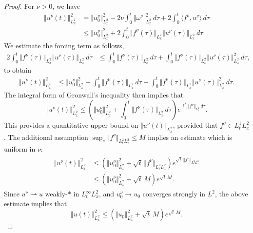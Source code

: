 \documentclass[reqno,12pt]{amsart}
\begin{document}
\begin{proof}
For $\nu > 0$, we have
\begin{align*}
\Vert u^\nu(t) \Vert_{L^2_x}^2
&=
\Vert u_0^\nu \Vert_{L^2_x}^2
- 2\nu \int_0^t \Vert \omega^\nu \Vert^2_{L^2_x} \, d\tau
+ 2\int_0^t \langle f^\nu, u^\nu \rangle \, d\tau
\\
&\le
\Vert u_0^\nu \Vert_{L^2_x}^2
+ 2\int_0^t \Vert f^\nu (\tau)\Vert_{L^2_x} \Vert u^\nu (\tau)\Vert_{L^2_x}  \, d\tau
\end{align*}
We estimate the forcing term as follows,
\begin{align*}
2\int_0^t \Vert f^\nu (\tau)\Vert_{L^2_x} \Vert u^\nu (\tau)\Vert_{L^2_x}  \, d\tau
&\le
\int_0^t \Vert f^\nu (\tau) \Vert_{L^2_x} \, d\tau
+
\int_0^t \Vert f^\nu (\tau) \Vert_{L^2_x}  \Vert u^\nu(\tau) \Vert_{L^2_x}^2 \, d\tau,
\end{align*}
to obtain
\begin{align*}
\Vert u^\nu(t) \Vert_{L^2_x}^2
&\le
\Vert u_0^\nu \Vert_{L^2_x}^2 + \int_0^t \Vert f^\nu (\tau) \Vert_{L^2_x} \, d\tau
+ \int_0^t \Vert f^\nu (\tau) \Vert_{L^2_x}  \Vert u^\nu(\tau) \Vert_{L^2_x}^2 \, d\tau.
\end{align*}
The integral form of Gronwall's inequality then implies that
\begin{equation} \label{Gronwall}
\Vert u^\nu(t) \Vert_{L^2_x}^2
\le
\left(
\Vert u_0^\nu \Vert_{L^2_x}^2
+
\int_0^t \Vert f^\nu (\tau) \Vert_{L^2_x} \, d\tau
\right)
e^{\int_0^t \Vert f^\nu \Vert_{L^2_x} \, d\tau}.
\end{equation}
This provides a quantitative upper bound on $\Vert u^\nu (t) \Vert_{L^2_x}$, provided that $f^\nu \in L^1_t L^2_x$. The additional assumption $\sup_\nu \Vert f^\nu \Vert_{L^2_tL^2_x} \le M$ implies an estimate which is uniform in $\nu$:
\begin{align}
\label{eq:gron}
\begin{aligned}
\Vert u^\nu(t) \Vert_{L^2_x}^2
&\le
\left(
\Vert u_0^\nu \Vert_{L^2_x}^2
+
\sqrt{t} \,\Vert f^\nu \Vert_{L^2_t L^2_x}
\right)
e^{\sqrt{t} \, \Vert f^\nu \Vert_{L^2_t L^2_x} }
\\
&\le
\left(
\Vert u_0^\nu \Vert_{L^2_x}^2
+
\sqrt{t} \, M
\right)
e^{\sqrt{t} \, M }.
\end{aligned}
\end{align}
Since $u^\nu \rightharpoonup u$ weakly-$\ast$ in $L^\infty_t L^2_x$, and $u_0^\nu \to u_0$ converges strongly in $L^2$, the above estimate implies that
\[
\Vert u(t) \Vert_{L^2_x}^2
\le
\left(
\Vert u_0 \Vert_{L^2_x}^2
+
\sqrt{t} \, M
\right)
e^{\sqrt{t} \, M }.
\]
\end{proof}
\end{document}
